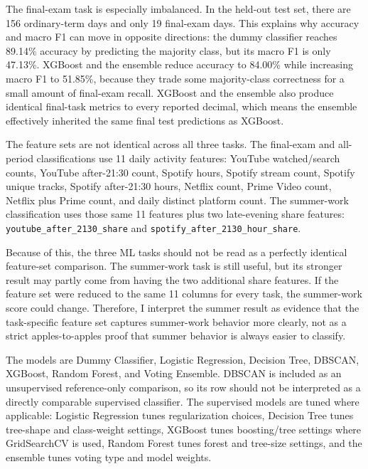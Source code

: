 \documentclass[11pt,a4paper]{article}
\begin{document}
The final-exam task is especially imbalanced. In the held-out test set, there are 156 ordinary-term days and only 19 final-exam days. This explains why accuracy and macro F1 can move in opposite directions: the dummy classifier reaches 89.14\% accuracy by predicting the majority class, but its macro F1 is only 47.13\%. XGBoost and the ensemble reduce accuracy to 84.00\% while increasing macro F1 to 51.85\%, because they trade some majority-class correctness for a small amount of final-exam recall. XGBoost and the ensemble also produce identical final-task metrics to every reported decimal, which means the ensemble effectively inherited the same final test predictions as XGBoost.

The feature sets are not identical across all three tasks. The final-exam and all-period classifications use 11 daily activity features: YouTube watched/search counts, YouTube after-21:30 count, Spotify hours, Spotify stream count, Spotify unique tracks, Spotify after-21:30 hours, Netflix count, Prime Video count, Netflix plus Prime count, and daily distinct platform count. The summer-work classification uses those same 11 features plus two late-evening share features: \texttt{youtube\_after\_2130\_share} and \texttt{spotify\_after\_2130\_hour\_share}.

Because of this, the three ML tasks should not be read as a perfectly identical feature-set comparison. The summer-work task is still useful, but its stronger result may partly come from having the two additional share features. If the feature set were reduced to the same 11 columns for every task, the summer-work score could change. Therefore, I interpret the summer result as evidence that the task-specific feature set captures summer-work behavior more clearly, not as a strict apples-to-apples proof that summer behavior is always easier to classify.

The models are Dummy Classifier, Logistic Regression, Decision Tree, DBSCAN, XGBoost, Random Forest, and Voting Ensemble. DBSCAN is included as an unsupervised reference-only comparison, so its row should not be interpreted as a directly comparable supervised classifier. The supervised models are tuned where applicable: Logistic Regression tunes regularization choices, Decision Tree tunes tree-shape and class-weight settings, XGBoost tunes boosting/tree settings where GridSearchCV is used, Random Forest tunes forest and tree-size settings, and the ensemble tunes voting type and model weights.
\end{document}
